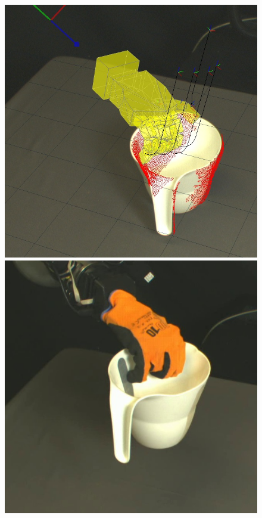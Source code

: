 \begin{figure}
\begin{center}
  \includegraphics[width=\tw]{images/experiments/query/jug-1-s} \hspace{-6pt}
 \includegraphics[width=\tw]{images/experiments/exec/jug-s}

\end{center}
\end{figure}
